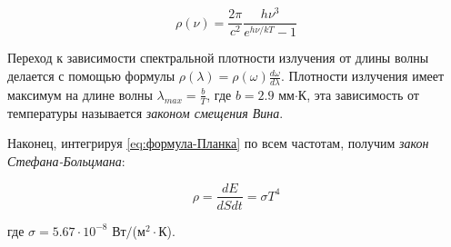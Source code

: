 \begin{equation} \label{eq:формула-Планка}
    \rho (\nu) = \frac{2 \pi}{c^2} \frac{h \nu^3}{e^{h \nu / k T} - 1}
\end{equation}

Переход к зависимости спектральной плотности излучения от длины волны делается с помощью формулы $\rho (\lambda) = \rho (\omega) \frac{d \omega}{d \lambda}$. Плотности излучения имеет максимум на длине волны $\lambda_{max} = \frac{b}{T}$, где $b = 2.9$ мм$\cdot$К, эта зависимость от температуры называется \textit{законом смещения Вина}.

Наконец, интегрируя \eqref{eq:формула-Планка} по всем частотам, получим \textit{закон Стефана-Больцмана}:

\begin{equation}
    \rho = \frac{d E}{d S dt} = \sigma T^4
\end{equation}

\noindent
где $\sigma = 5.67 \cdot 10^{-8}$ Вт$/$(м$^2 \cdot$К).